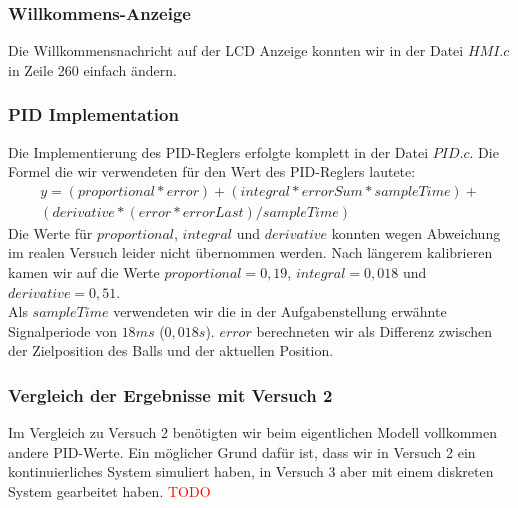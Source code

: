 \subsubsection{Willkommens-Anzeige}
Die Willkommensnachricht auf der LCD Anzeige konnten wir in der Datei $HMI.c$ in Zeile 260 einfach ändern.

\subsubsection{PID Implementation}
Die Implementierung des PID-Reglers erfolgte komplett in der Datei $PID.c$. Die Formel die wir verwendeten für den Wert des PID-Reglers lautete:
\begin{multline}
y = (proportional * error) + (integral * errorSum * sampleTime) + \\
(derivative * (error * errorLast) / sampleTime)
\end{multline}
Die Werte für $proportional$, $integral$ und $derivative$ konnten wegen Abweichung im realen Versuch leider nicht übernommen werden. Nach längerem kalibrieren kamen wir auf die Werte $proportional = 0,19$, $integral = 0,018$ und $derivative = 0,51$.\\
Als $sampleTime$ verwendeten wir die in der Aufgabenstellung erwähnte Signalperiode von $18 ms$ ($0,018 s$). $error$ berechneten wir als Differenz zwischen der Zielposition des Balls und der aktuellen Position.

\subsubsection{Vergleich der Ergebnisse mit Versuch 2}
Im Vergleich zu Versuch 2 benötigten wir beim eigentlichen Modell vollkommen andere PID-Werte. Ein möglicher Grund dafür ist, dass wir in Versuch 2 ein kontinuierliches System simuliert haben, in Versuch 3 aber mit einem diskreten System gearbeitet haben.
\textcolor{red}{TODO}

